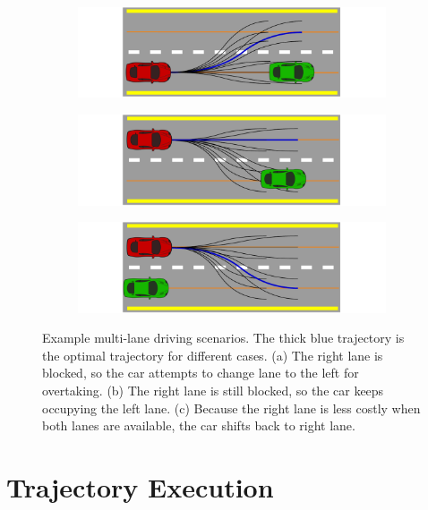 \begin{figure}[h]
  \centering
  \begin{subfigure}[b]{1.0\linewidth}
    \includegraphics[width=\linewidth]{figures/frenet-shift-left-lane.pdf}
    \caption{}
  \end{subfigure}
  \begin{subfigure}[b]{1.0\linewidth}
    \includegraphics[width=\linewidth]{figures/frenet-keep-left-lane.pdf}
    \caption{}
  \end{subfigure}
  \begin{subfigure}[b]{1.0\linewidth}
    \includegraphics[width=\linewidth]{figures/frenet-shift-right-lane.pdf}
    \caption{}
  \end{subfigure}
  \caption[Example frenet frame optimal trajectories]{Example multi-lane
    driving scenarios. The thick blue trajectory is the optimal trajectory for
    different cases. (a) The right lane is blocked, so the car attempts to
    change lane to the left for overtaking.  (b) The right lane is still
    blocked, so the car keeps occupying the left lane. (c) Because the right
    lane is less costly when both lanes are available, the car shifts back to
    right lane.}
  \label{figure:frenet-lanes}
\end{figure}

\section{Trajectory Execution}

